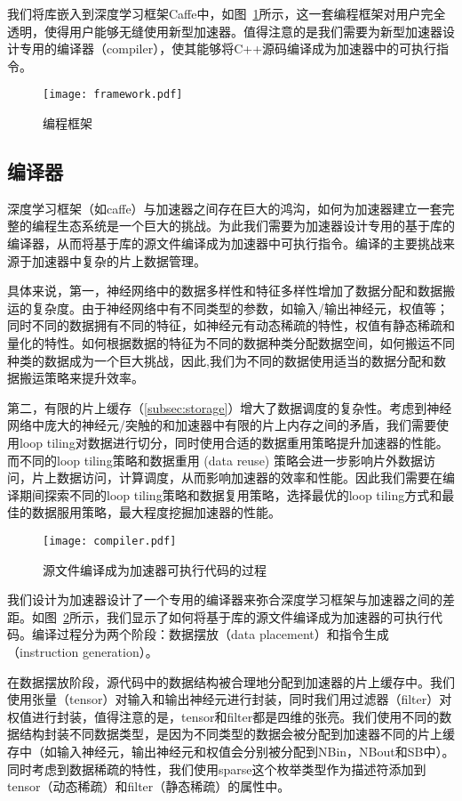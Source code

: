 我们将库嵌入到深度学习框架Caffe中，如图~\ref{fig:framework}所示，这一套编程框架对用户完全透明，使得用户能够无缝使用新型加速器。值得注意的是我们需要为新型加速器设计专用的编译器（compiler），使其能够将C++源码编译成为加速器中的可执行指令。

\begin{figure}
\centering
\texttt{[image: framework.pdf]}
\caption{编程框架}
\label{fig:framework}
\end{figure}

\subsection{编译器}
深度学习框架（如caffe）与加速器之间存在巨大的鸿沟，如何为加速器建立一套完整的编程生态系统是一个巨大的挑战。为此我们需要为加速器设计专用的基于库的编译器，从而将基于库的源文件编译成为加速器中可执行指令。编译的主要挑战来源于加速器中复杂的片上数据管理。

具体来说，第一，神经网络中的数据多样性和特征多样性增加了数据分配和数据搬运的复杂度。由于神经网络中有不同类型的参数，如输入/输出神经元，权值等；同时不同的数据拥有不同的特征，如神经元有动态稀疏的特性，权值有静态稀疏和量化的特性。如何根据数据的特征为不同的数据种类分配数据空间，如何搬运不同种类的数据成为一个巨大挑战，因此,我们为不同的数据使用适当的数据分配和数据搬运策略来提升效率。

第二，有限的片上缓存（\ref{subsec:storage}）增大了数据调度的复杂性。考虑到神经网络中庞大的神经元/突触的和加速器中有限的片上内存之间的矛盾，我们需要使用loop tiling对数据进行切分，同时使用合适的数据重用策略提升加速器的性能。而不同的loop tiling策略和数据重用 (data reuse) 策略会进一步影响片外数据访问，片上数据访问，计算调度，从而影响加速器的效率和性能。因此我们需要在编译期间探索不同的loop tiling策略和数据复用策略，选择最优的loop tiling方式和最佳的数据服用策略，最大程度挖掘加速器的性能。

\begin{figure}[h]

\centering
\texttt{[image: compiler.pdf]}
\caption{源文件编译成为加速器可执行代码的过程}
\label{fig:compiler}
\end{figure}

我们设计为加速器设计了一个专用的编译器来弥合深度学习框架与加速器之间的差距。如图~\ref{fig:compiler}所示，我们显示了如何将基于库的源文件编译成为加速器的可执行代码。编译过程分为两个阶段：数据摆放（data placement）和指令生成（instruction generation）。

在数据摆放阶段，源代码中的数据结构被合理地分配到加速器的片上缓存中。我们使用张量（tensor）对输入和输出神经元进行封装，同时我们用过滤器（filter）对权值进行封装，值得注意的是，tensor和filter都是四维的张亮。我们使用不同的数据结构封装不同数据类型，是因为不同类型的数据会被分配到加速器不同的片上缓存中（如输入神经元，输出神经元和权值会分别被分配到NBin，NBout和SB中）。同时考虑到数据稀疏的特性，我们使用sparse这个枚举类型作为描述符添加到tensor（动态稀疏）和filter（静态稀疏）的属性中。

